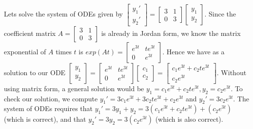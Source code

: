 Lets solve the system of ODEs given by  
$
\begin{bmatrix}
y_1'\\
y_2'
\end{bmatrix}
=
\begin{bmatrix}
3&1\\
0&3
\end{bmatrix}
\begin{bmatrix}
y_1\\
y_2
\end{bmatrix}
$. Since the coefficient matrix $A = \begin{bmatrix}
3&1\\
0&3
\end{bmatrix}
$ is already in Jordan form, we know the matrix exponential of $A$ times $t$ is 
$exp(At) = 
\begin{bmatrix}
e^{3t}&te^{3t}\\
0&e^{3t}
\end{bmatrix}
$.  Hence we have as a solution to our ODE 
$
\begin{bmatrix}
y_1\\
y_2
\end{bmatrix}
=
\begin{bmatrix}
e^{3t}&te^{3t}\\
0&e^{3t}
\end{bmatrix}
\begin{bmatrix}
c_1\\
c_2
\end{bmatrix}
=
\begin{bmatrix}
c_1e^{3t}+c_2te^{3t}\\
c_2e^{3t}
\end{bmatrix}$. Without using matrix form, a general solution would be $y_1=c_1e^{3t}+c_2te^{3t}, y_2=c_2e^{3t}$.  To check our solution, we compute $y_1' = 3c_1e^{3t}+3c_2te^{3t}+c_2e^{3t}$ and $y_2' = 3c_2e^{3t}$.  The system of ODEs requires that $y_1' = 3y_1+y_2 = 3(c_1e^{3t}+c_2te^{3t})+(c_2e^{3t})$ (which is correct), and that $y_2' = 3y_2 = 3(c_2e^{3t})$ (which is also correct). 

